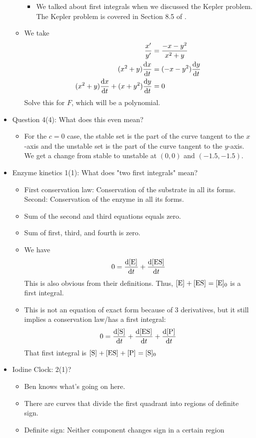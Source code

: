 \documentclass[../notes.tex]{subfiles}
\begin{document}
\begin{itemize}
\begin{itemize}
\begin{itemize}
            \item We talked about first integrals when we discussed the Kepler problem. The Kepler problem is covered in Section 8.5 of \textcite{bib:Teschl}.
        \end{itemize}
        \item We take
        \begin{align*}
            \frac{x'}{y'} &= \frac{-x-y^2}{x^2+y}\\
            (x^2+y)\dv{x}{t} &= (-x-y^2)\dv{y}{t}\\
            (x^2+y)\dv{x}{t}+(x+y^2)\dv{y}{t} &= 0
        \end{align*}
        Solve this for $F$, which will be a polynomial.
    \end{itemize}
    \item Question 4(4): What does this even mean?
    \begin{itemize}
        \item For the $c=0$ case, the stable set is the part of the curve tangent to the $x$-axis and the unstable set is the part of the curve tangent to the $y$-axis. We get a change from stable to unstable at $(0,0)$ and $(-1.5,-1.5)$.
    \end{itemize}
    \item Enzyme kinetics 1(1): What does "two first integrals" mean?
    \begin{itemize}
        \item First conservation law: Conservation of the substrate in all its forms. Second: Conservation of the enzyme in all its forms.
        \item Sum of the second and third equations equals zero.
        \item Sum of first, third, and fourth is zero.
        \item We have
        \begin{equation*}
            0 = \dv{\cnc{E}}{t}+\dv{\cnc{ES}}{t}
        \end{equation*}
        This is also obvious from their definitions. Thus, $\cnc{E}+\cnc{ES}=\cnc[0]{E}$ is a first integral.
        \item This is not an equation of exact form because of 3 derivatives, but it still implies a conservation law/has a first integral:
        \begin{equation*}
            0 = \dv{\cnc{S}}{t}+\dv{\cnc{ES}}{t}+\dv{\cnc{P}}{t}
        \end{equation*}
        That first integral is $\cnc{S}+\cnc{ES}+\cnc{P}=\cnc[0]{S}$
    \end{itemize}
    \item Iodine Clock: 2(1)?
    \begin{itemize}
        \item Ben knows what's going on here.
        \item There are curves that divide the first quadrant into regions of definite sign.
        \item Definite sign: Neither component changes sign in a certain region
    \end{itemize}
\end{itemize}
\end{document}
